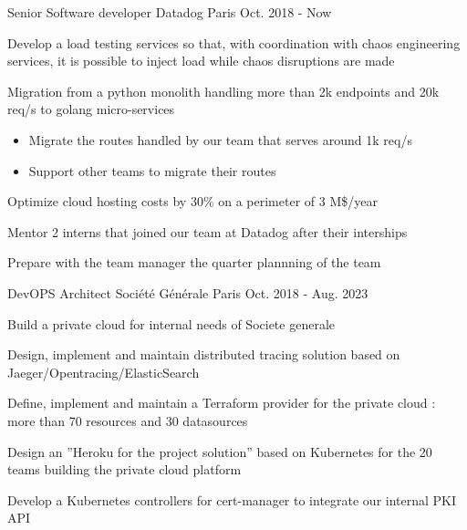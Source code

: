 \documentclass[12pt, a4paper]{awesome-cv}
\begin{document}
\begin{cventries}
  \cventry
    {Senior Software developer} 
    {Datadog} 
    {Paris} 
    {Oct. 2018 - Now} 
    {
      \begin{cvitems} 
	    \item{Develop a load testing services so that, with coordination with chaos engineering services, it is possible to inject load while chaos disruptions are made} 
		\item{Migration from a python monolith handling more than 2k endpoints and 20k req/s to golang micro-services} 
		\begin{itemize}
		  \item{ Migrate the routes handled by our team that serves around 1k req/s}
		  \item{Support other teams to migrate their routes}
		\end{itemize}
		\item{Optimize cloud hosting costs by 30\% on a perimeter of 3 M\$/year}
		\item{Mentor 2 interns that joined our team at Datadog after their interships} 
		\item{Prepare with the team manager the quarter plannning of the team}
		\item{}
      \end{cvitems}
    }
	
  \cventry
    {DevOPS Architect} 
    {Société Générale} 
    {Paris} 
    {Oct. 2018 - Aug. 2023} 
    {
	  Build a private cloud for internal needs of Societe generale
	  \vspace{4.0mm}
      \begin{cvitems} 
        \item{Design, implement and maintain distributed tracing solution based on Jaeger/Opentracing/ElasticSearch}
		\item{Define, implement and maintain a Terraform provider for the private cloud : more than 70 resources and 30 datasources}
		\item{Design an ”Heroku for the project solution” based on Kubernetes for the 20 teams building the private cloud platform}
		\item{Develop a Kubernetes controllers for cert-manager to integrate our internal PKI API}
		\item{}
      \end{cvitems}
    }
	

\end{cventries}
\end{document}
